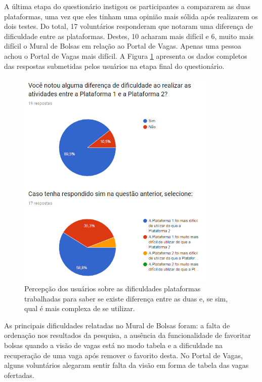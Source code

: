 A última etapa do questionário instigou os participantes a compararem as duas plataformas, uma vez que eles tinham uma opinião mais sólida após realizarem os dois testes. Do total, 17 voluntários responderam que notaram uma diferença de dificuldade entre as plataformas. Destes, 10 acharam mais difícil e 6, muito mais difícil o Mural de Bolsas em relação ao Portal de Vagas. Apenas uma pessoa achou o Portal de Vagas mais difícil. A Figura \ref{avalGrafABFinal} apresenta os dados completos das respostas submetidas pelos usuários na etapa final do questionário.

\begin{figure}[H]
    \caption{Percepção dos usuários sobre as dificuldades plataformas trabalhadas para saber se existe diferença entre as duas e, se sim, qual é mais complexa de se utilizar.}
       	\begin{center}
            \includegraphics[width=0.85\textwidth]{figuras/avaliacao/ab-final.png}
        \end{center}
    \label{avalGrafABFinal}
\end{figure} 

As principais dificuldades relatadas no Mural de Bolsas foram: a falta de ordenação nos resultados da pesquisa, a ausência da funcionalidade de favoritar bolsas quando a visão de vagas está no modo tabela e a dificuldade na recuperação de uma vaga após remover o favorito desta. No Portal de Vagas, alguns voluntários alegaram sentir falta da visão em forma de tabela das vagas ofertadas.


